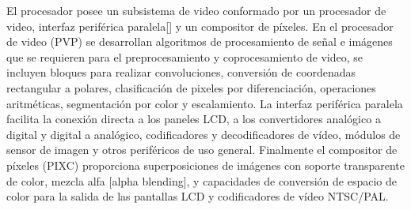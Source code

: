 El procesador posee un subsistema de video conformado por un procesador de video, interfaz periférica paralela[] y un
compositor de píxeles. En el procesador de video (PVP) se desarrollan algoritmos de procesamiento de señal e imágenes que
se requieren para el preprocesamiento y coprocesamiento de video, se incluyen bloques para realizar convoluciones, 
conversión de coordenadas rectangular a polares, clasificación de pixeles por diferenciación, operaciones aritméticas,
segmentación por color\cite{sevilla} y escalamiento. La interfaz periférica paralela facilita la conexión directa a los
paneles LCD, a los convertidores analógico a digital y digital a analógico, codificadores y decodificadores de vídeo,
módulos de sensor de imagen y otros periféricos de uso general. Finalmente el compositor de píxeles (PIXC) proporciona
superposiciones de imágenes con soporte transparente de color, mezcla alfa [alpha blending], y capacidades de conversión
de espacio de color para la salida de las pantallas LCD y codificadores 
de vídeo NTSC/PAL.



